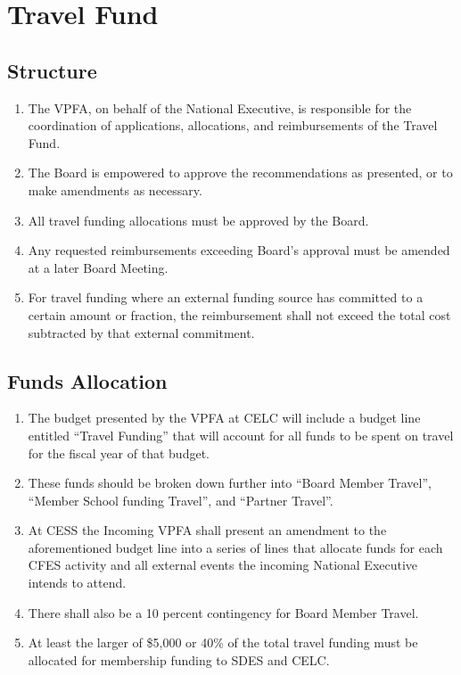\section{Travel Fund}
\label{travel-fund}

\subsection{Structure}
\label{structure-2}

\begin{enumerate}
 \item
  The VPFA, on behalf of the National Executive, is responsible for the coordination of applications, allocations, and reimbursements of the Travel Fund.
 \item
  The Board is empowered to approve the recommendations as presented, or to make amendments as necessary.
 \item
  All travel funding allocations must be approved by the Board.
 \item
  Any requested reimbursements exceeding Board's approval must be amended at a later Board Meeting.
 \item
  For travel funding where an external funding source has committed to a certain amount or fraction, the reimbursement shall not exceed the total cost subtracted by that external commitment.
\end{enumerate}

\subsection{Funds Allocation}
\label{funds-allocation}

\begin{enumerate}
 \item
  The budget presented by the VPFA at CELC will include a budget line entitled “Travel Funding” that will account for all funds to be spent on travel for the fiscal year of that budget.
 \item
  These funds should be broken down further into “Board Member Travel”, “Member School funding Travel”, and “Partner Travel”.
 \item
  At CESS the Incoming VPFA shall present an amendment to the aforementioned budget line into a series of lines that allocate funds for each CFES activity and all external events the incoming National Executive intends to attend.
 \item
  There shall also be a 10 percent contingency for Board Member Travel.
 \item
  At least the larger of \$5,000 or 40\% of the total travel funding must be allocated for membership funding to SDES and CELC.
\end{enumerate}

